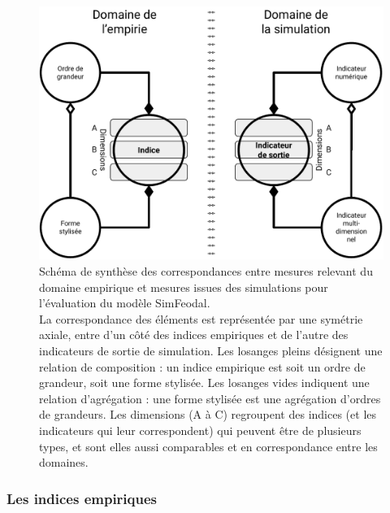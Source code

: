 \begin{figure}[H]
\captionsetup{width=\linewidth}
\includegraphics[width=\linewidth]{img/schema_indice_indicateur.pdf}
\caption{Schéma de synthèse des correspondances entre mesures relevant du domaine empirique et mesures issues des simulations pour l'évaluation du modèle SimFeodal.\\
La correspondance des éléments est représentée par une symétrie axiale, entre d'un côté des \og indices empiriques\fg{} et de l'autre des \og indicateurs de sortie de simulation\fg{}.
Les losanges pleins désignent une relation de composition :
un \og indice empirique\fg{} est soit un ordre de grandeur, soit une forme stylisée.
Les losanges vides indiquent une relation d'agrégation :
une forme stylisée est une agrégation d'ordres de grandeurs.
Les dimensions (A à C) regroupent des indices (et les indicateurs qui leur correspondent) qui peuvent être de plusieurs types, et sont elles aussi comparables et en correspondance entre les domaines.
} 
\label{fig:schema_indices} 
\end{figure}


\subsubsection{Les indices empiriques}

